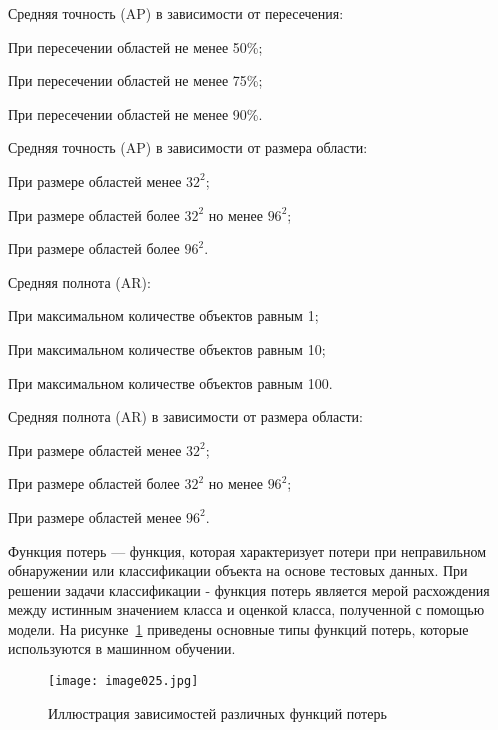 %
\begin{itemize*}
  \item Средняя точность (AP) в зависимости от пересечения:
	\begin{itemize*}
	  \item При пересечении областей не менее 50\%;
	  \item При пересечении областей не менее 75\%;
	  \item При пересечении областей не менее 90\%.
	\end{itemize*}
  \item Средняя точность (AP) в зависимости от размера области:
	\begin{itemize*}
	  \item При размере областей менее \(32^2\);
	  \item При размере областей более \(32^2\) но менее \(96^2\);
	  \item При размере областей более \(96^2\).
	\end{itemize*}
  \item Средняя полнота (AR):
	\begin{itemize*}
	  \item При максимальном количестве объектов равным 1;
	  \item При максимальном количестве объектов равным 10;
	  \item При максимальном количестве объектов равным 100.
	\end{itemize*}
  \item Средняя полнота (AR) в зависимости от размера области:
	\begin{itemize*}
	  \item При размере областей менее \(32^2\);
	  \item При размере областей более \(32^2\) но менее \(96^2\);
	  \item При размере областей менее \(96^2\).
	\end{itemize*}
\end{itemize*}
%

Функция потерь — функция, которая характеризует потери при неправильном обнаружении или классификации объекта на основе тестовых данных. При решении задачи классификации - функция потерь является мерой расхождения между истинным значением класса и оценкой класса, полученной с помощью модели.
На рисунке~\ref{fig:lossfunctions}  приведены основные типы функций потерь, которые используются в машинном обучении.

\begin{figure}[htbp]
\centering
\texttt{[image: image025.jpg]}
\caption{Иллюстрация зависимостей различных функций потерь\cite{twentyone}}%
\label{fig:lossfunctions}
\end{figure}

